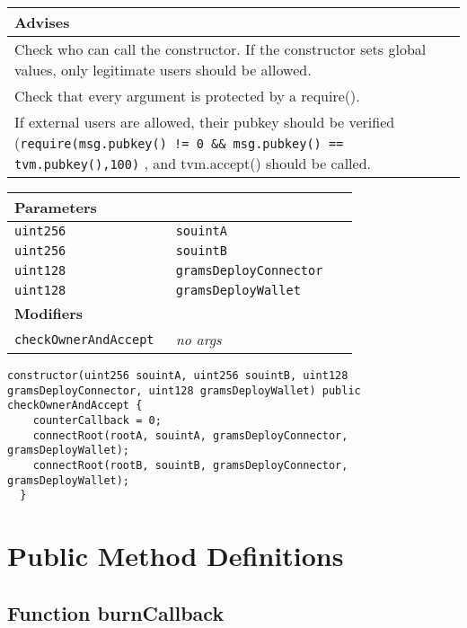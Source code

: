\ifsoldraft
\noindent\begin{tabular}{|p{12cm}|}\hline
\rowcolor{green}Advises
\\\hline
Check who can call the constructor. If the constructor sets global values, only legitimate users should be allowed.
\\\hline
Check that every argument is protected by a require().
\\\hline
If external users are allowed, their pubkey should be verified (\verb+require(msg.pubkey() != 0 && msg.pubkey() == tvm.pubkey(),100)+ , and tvm.accept() should be called.
\\\hline\end{tabular}
\fi

\ifsoltables
\noindent\begin{tabular}{|l|l|p{5cm}|}\hline
\multicolumn{3}{|l|}{\bf Parameters}\\\hline
\tt uint256 & \tt souintA &\\\hline
\tt uint256 & \tt souintB &\\\hline
\tt uint128 & \tt gramsDeployConnector &\\\hline
\tt uint128 & \tt gramsDeployWallet &\\\hline
\multicolumn{3}{|l|}{\bf Modifiers}\\\hline
\tt checkOwnerAndAccept & {\em no args} &\\\hline
\end{tabular}
\fi

\vspace{2cm}

\begin{lstlisting}[firstnumber=88]
  constructor(uint256 souintA, uint256 souintB, uint128 gramsDeployConnector, uint128 gramsDeployWallet) public checkOwnerAndAccept {
    counterCallback = 0;
    connectRoot(rootA, souintA, gramsDeployConnector, gramsDeployWallet);
    connectRoot(rootB, souintB, gramsDeployConnector, gramsDeployWallet);
  }
\end{lstlisting}

\section{Public Method Definitions}


\subsection{Function burnCallback}


